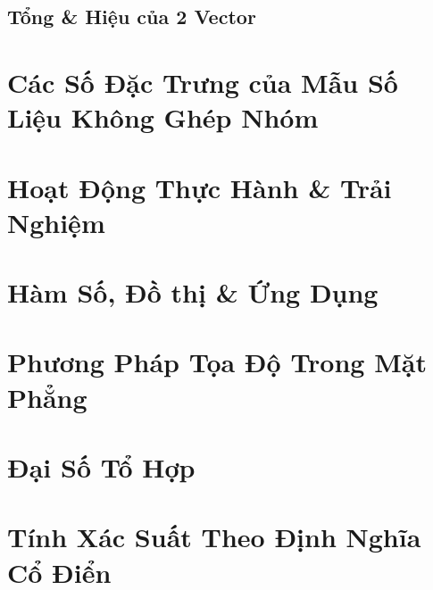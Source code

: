 \documentclass{article}
\numberwithin{equation}{section}
\begin{document}
\subsection{Tổng \& Hiệu của 2 Vector}


\section{Các Số Đặc Trưng của Mẫu Số Liệu Không Ghép Nhóm}


\section*{Hoạt Động Thực Hành \& Trải Nghiệm}


\section{Hàm Số, Đồ thị \& Ứng Dụng}
\cite{Khoai_Anh_Tan_Thang_Anh_Cuong_Duong_Dang_Ha_Hanh_Hong_Son_Tuan_Vuong_Toan_10_tap_2}


\section{Phương Pháp Tọa Độ Trong Mặt Phẳng}


\section{Đại Số Tổ Hợp}


\section{Tính Xác Suất Theo Định Nghĩa Cổ Điển}

\end{document}
